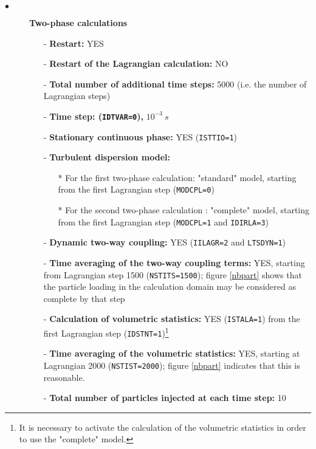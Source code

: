 \documentclass[a4paper,twoside,12pt]{article}
\begin{document}
\begin{description}
   \item[$\bullet$]\textbf{Two-phase calculations}
         \begin{itemize}
            \item[-] {\bf Restart:} YES
            \item[-] {\bf Restart of the Lagrangian calculation:} NO
            \item[-] {\bf Total number of additional time steps:} 5000
                  (i.e. the number of Lagrangian steps)
            \item[-] {\bf Time step: (\texttt{IDTVAR=0}),} $10^{-3}~s$
            \item[-] \textbf{Stationary continuous phase:} YES (\texttt{ISTTIO=1})
            \item[-] {\bf Turbulent dispersion model:}
                  \begin{itemize}
                     \item[*] For the first two-phase calculation: "standard" model, starting from the first Lagrangian step (\texttt{MODCPL=0})
                     \item[*] For the second two-phase calculation : "complete" model, starting from the first Lagrangian step (\texttt{MODCPL=1} and \texttt{IDIRLA=3})
                  \end{itemize}
            \item[-] {\bf Dynamic two-way coupling:} YES (\texttt{IILAGR=2} and \texttt{LTSDYN=1})
            \item[-] {\bf Time averaging of the two-way coupling terms:} YES, starting from Lagrangian step 1500 (\texttt{NSTITS=1500}); figure
                  \ref{nbpart} shows that the particle loading in the calculation domain may be considered as complete by that step
            \item[-] {\bf Calculation of volumetric statistics:} YES
                  (\texttt{ISTALA=1}) from the first Lagrangian step
                  (\texttt{IDSTNT=1})\footnote{It is necessary to activate the calculation of the volumetric statistics in order to use the "complete" model.}
            \item[-] {\bf Time averaging of the volumetric statistics:} YES, starting at Lagrangian 2000 (\texttt{NSTIST=2000}); figure \ref{nbpart} indicates that this is reasonable.
            \item[-] {\bf Total number of particles injected at each time step:} 10


\end{itemize}
\end{description}
\end{document}
